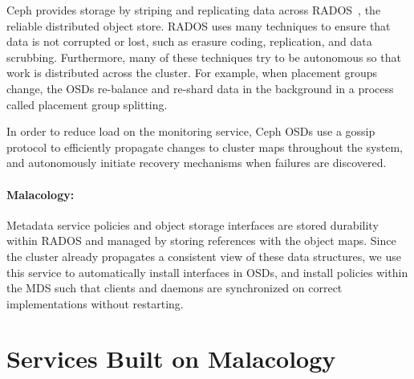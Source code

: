\documentclass[10pt,twocolumn]{article}
\begin{document}
Ceph provides storage by striping and replicating data across
RADOS~\cite{weil_rados_2007}, the reliable distributed object store. RADOS
uses many techniques to ensure that data is not corrupted or lost, such as
erasure coding, replication, and data scrubbing. Furthermore, many of these
techniques try to be autonomous so that work is distributed across the
cluster. For example, when placement groups change, the OSDs re-balance and
re-shard data in the background in a process called placement group splitting.

In order to reduce load on the monitoring service, Ceph OSDs use a gossip
protocol to efficiently propagate changes to cluster maps throughout the
system, and autonomously initiate recovery mechanisms when failures are
discovered.

\paragraph*{Malacology:} Metadata service policies and object storage
interfaces are stored durability within RADOS and managed by storing references
with the object maps. Since the cluster already propagates a consistent view of
these data structures, we use this service to automatically install interfaces
in OSDs, and install policies within the MDS such that clients and daemons are
synchronized on correct implementations without restarting.

\section{Services Built on Malacology}
\label{sec:services}
\label{services-built-on-malacology}
\end{document}
